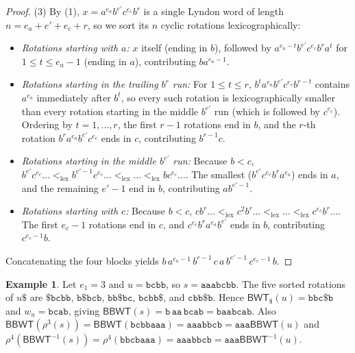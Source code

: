\documentclass[11pt,a4paper]{article}
\theoremstyle{definition}
\newtheorem{example}{Example}
\newcommand{\BBWT}{\mathsf{BBWT}}
\newcommand{\BWT}{\mathsf{BWT}}
\newcommand{\lex}{\mathrm{lex}}
\begin{document}
\begin{proof}
(3) By (1), $x = a^{e_a} b^{e'} c^{e_c} b^r$ is a single Lyndon word of length $n = e_a + e' + e_c + r$, so we sort its $n$ cyclic rotations lexicographically:
\begin{itemize}[leftmargin=*]
    \item \emph{Rotations starting with $a$:} $x$ itself (ending in $b$), followed by $a^{e_a - t} b^{e'} c^{e_c} b^r a^t$ for $1 \le t \le e_a - 1$ (ending in $a$), contributing $b a^{e_a - 1}$.
    \item \emph{Rotations starting in the trailing $b^r$ run:} For $1 \le t \le r$, $b^t a^{e_a} b^{e'} c^{e_c} b^{r-t}$ contains $a^{e_a}$ immediately after $b^t$, so every such rotation is lexicographically smaller than every rotation starting in the middle $b^{e'}$ run (which is followed by $c^{e_c}$). Ordering by $t = 1, \dots, r$, the first $r - 1$ rotations end in $b$, and the $r$-th rotation $b^r a^{e_a} b^{e'} c^{e_c}$ ends in $c$, contributing $b^{r-1} c$.
    \item \emph{Rotations starting in the middle $b^{e'}$ run:} Because $b < c$, $b^{e'} c^{e_c} \dots <_{\lex} b^{e'-1} c^{e_c} \dots <_{\lex} \dots <_{\lex} b c^{e_c} \dots$. The smallest ($b^{e'} c^{e_c} b^r a^{e_a}$) ends in $a$, and the remaining $e' - 1$ end in $b$, contributing $a b^{e'-1}$.
    \item \emph{Rotations starting with $c$:} Because $b < c$, $c b^r \dots <_{\lex} c^2 b^r \dots <_{\lex} \dots <_{\lex} c^{e_c} b^r \dots$. The first $e_c - 1$ rotations end in $c$, and $c^{e_c} b^r a^{e_a} b^{e'}$ ends in $b$, contributing $c^{e_c - 1} b$.
\end{itemize}
Concatenating the four blocks yields $b \, a^{e_a - 1} \, b^{r-1} \, c \, a \, b^{e'-1} \, c^{e_c - 1} \, b$.
\end{proof}

\begin{example}
Let $e_1=3$ and $u=\texttt{bcbb}$, so $s=\texttt{aaabcbb}$. The five sorted rotations of $u\$$ are $\texttt{\$bcbb}$, $\texttt{b\$bcb}$, $\texttt{bb\$bc}$, $\texttt{bcbb\$}$, and $\texttt{cbb\$b}$. Hence $\BWT_{\$}(u)=\texttt{bbc\$b}$ and $w_u=\texttt{bcab}$, giving $\BBWT(s)=\texttt{b}\,\texttt{aa}\,\texttt{bcab}=\texttt{baabcab}$. Also $\BBWT(\rho^3(s))=\BBWT(\texttt{bcbbaaa})=\texttt{aaabbcb}=\texttt{aaa}\BBWT(u)$ and $\rho^4(\BBWT^{-1}(s))=\rho^4(\texttt{bbcbaaa})=\texttt{aaabbcb}=\texttt{aaa}\BBWT^{-1}(u)$.
\end{example}
\end{document}
